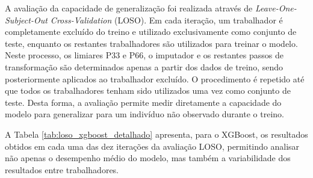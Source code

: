 A avaliação da capacidade de generalização foi realizada através de \textit{Leave-One-Subject-Out Cross-Validation} (LOSO). Em cada iteração, um trabalhador é completamente excluído do treino e utilizado exclusivamente como conjunto de teste, enquanto os restantes trabalhadores são utilizados para treinar o modelo. Neste processo, os limiares P33 e P66, o imputador e os restantes passos de transformação são determinados apenas a partir dos dados de treino, sendo posteriormente aplicados ao trabalhador excluído. O procedimento é repetido até que todos os trabalhadores tenham sido utilizados uma vez como conjunto de teste. Desta forma, a avaliação permite medir diretamente a capacidade do modelo para generalizar para um indivíduo não observado durante o treino.

A Tabela \ref{tab:loso_xgboost_detalhado} apresenta, para o XGBoost, os resultados obtidos em cada uma das dez iterações da avaliação LOSO, permitindo analisar não apenas o desempenho médio do modelo, mas também a variabilidade dos resultados entre trabalhadores.

\begin{table}[H]
\centering
\caption{Validação LOSO do modelo XGBoost Classifier.}
\label{tab:loso_xgboost_detalhado}
\tiny
{}
\end{table}

